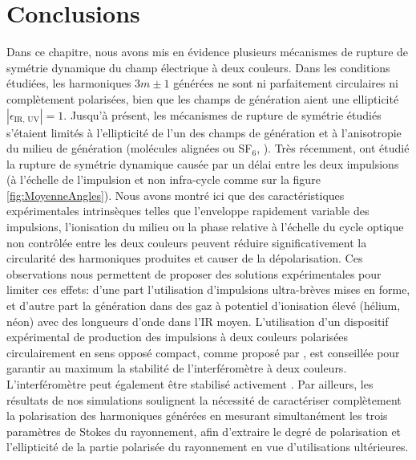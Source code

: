 \section*{Conclusions}
Dans ce chapitre, nous avons mis en évidence plusieurs mécanismes de rupture de symétrie dynamique du champ électrique à deux couleurs. Dans les conditions étudiées, les harmoniques $3m \pm 1$ générées ne sont ni parfaitement circulaires ni complètement polarisées, bien que les champs de génération aient une ellipticité $|\epsilon_{\text{IR, UV}}| = 1$. Jusqu'à présent, les mécanismes de rupture de symétrie étudiés s'étaient limités à l'ellipticité de l'un des champs de génération   et à l'anisotropie du milieu de génération (molécules alignées ou SF$_6$, ). Très récemment,  ont étudié la rupture de symétrie dynamique causée par un délai entre les deux impulsions (à l'échelle de l'impulsion et non infra-cycle comme sur la figure \ref{fig:MoyenneAngles}). Nous avons montré ici que des caractéristiques expérimentales intrinsèques telles que l'enveloppe rapidement variable des impulsions, l'ionisation du milieu ou la phase relative à l'échelle du cycle optique non contrôlée entre les deux couleurs peuvent réduire significativement la circularité des harmoniques produites et causer de la dépolarisation. Ces observations nous permettent de proposer des solutions expérimentales pour limiter ces effets: d'une part l'utilisation d'impulsions ultra-brèves mises en forme, et d'autre part la génération dans des gaz à potentiel d'ionisation élevé (hélium, néon) avec des longueurs d'onde dans l'IR moyen. L'utilisation d'un dispositif expérimental de production des impulsions à deux couleurs polarisées circulairement en sens opposé compact, comme proposé par , est conseillée pour garantir au maximum la stabilité de l'interféromètre à deux couleurs. L'interféromètre peut également être stabilisé activement . Par ailleurs, les résultats de nos simulations soulignent la nécessité de caractériser complètement la polarisation des harmoniques générées en mesurant simultanément les trois paramètres de Stokes du rayonnement, afin d'extraire le degré de polarisation et l'ellipticité de la partie polarisée du rayonnement en vue d'utilisations ultérieures.






